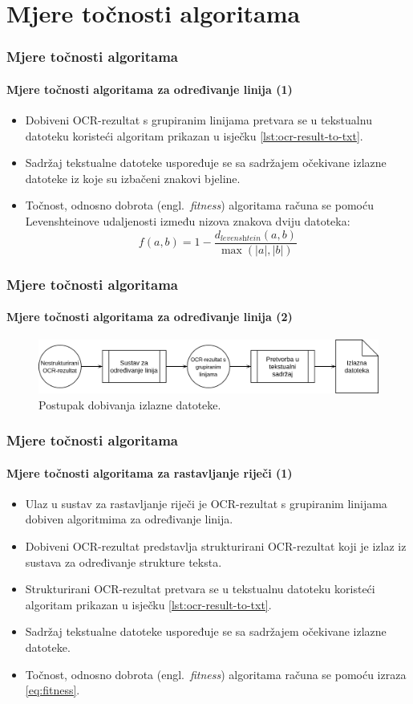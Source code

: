 \documentclass{beamer}
\newcommand{\engl}[1]{(engl.~\emph{#1})}
\begin{document}
\section{Mjere točnosti algoritama}
\begin{frame}
\frametitle{Mjere točnosti algoritama}
\framesubtitle{Mjere točnosti algoritama za određivanje linija (1)}
\begin{itemize}
    \item Dobiveni OCR-rezultat s grupiranim linijama pretvara se u
          tekstualnu datoteku koristeći algoritam prikazan u isječku
          \ref{lst:ocr-result-to-txt}.
    \item Sadržaj tekstualne datoteke uspoređuje se sa
          sadržajem očekivane izlazne datoteke iz koje su izbačeni
          znakovi bjeline.
    \item Točnost, odnosno dobrota \engl{fitness} algoritama računa se
          pomoću Levenshteinove udaljenosti između nizova znakova dviju datoteka:
    \begin{equation}
    \label{eq:fitness}
    f(a, b) = 1 - \frac{d_{\textit{levenshtein}}(a, b)}{\max(|a|, |b|)}
    \end{equation}
\end{itemize}
\end{frame}
\begin{frame}
\frametitle{Mjere točnosti algoritama}
\framesubtitle{Mjere točnosti algoritama za određivanje linija (2)}
\begin{figure}[htb]
    \centering
    \includegraphics[width=\textwidth]{images/sustav-04.png}
    \caption{Postupak dobivanja izlazne datoteke.}
    \label{fig:sustav-04}
\end{figure}
\end{frame}
\begin{frame}
\frametitle{Mjere točnosti algoritama}
\framesubtitle{Mjere točnosti algoritama za rastavljanje riječi (1)}
\begin{itemize}
    \item Ulaz u sustav za rastavljanje riječi je OCR-rezultat s grupiranim
          linijama dobiven algoritmima za određivanje linija.
    \item Dobiveni OCR-rezultat predstavlja strukturirani OCR-rezultat koji
          je izlaz iz sustava za određivanje strukture teksta.
    \item Strukturirani OCR-rezultat pretvara se u tekstualnu datoteku
          koristeći algoritam prikazan u isječku \ref{lst:ocr-result-to-txt}.
    \item Sadržaj tekstualne datoteke uspoređuje se sa sadržajem očekivane
          izlazne datoteke.
    \item Točnost, odnosno dobrota \engl{fitness} algoritama računa se
          pomoću izraza \ref{eq:fitness}.
\end{itemize}
\end{frame}
\end{document}
